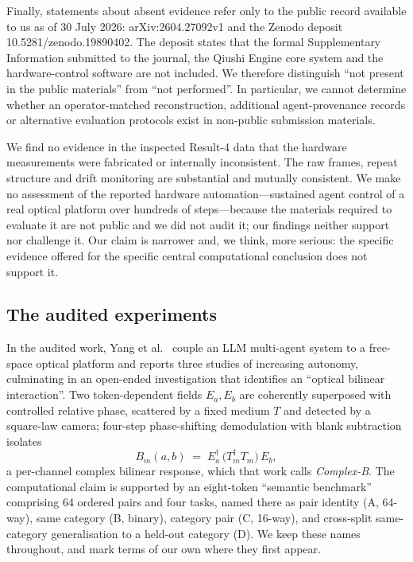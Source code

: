 \documentclass[11pt,a4paper]{article}
\begin{document}
Finally, statements about absent evidence refer only to the public record
available to us as of 30 July 2026: arXiv:2604.27092v1 and the Zenodo deposit
10.5281/zenodo.19890402. The deposit states that the formal Supplementary
Information submitted to the journal, the Qiushi Engine core system and the
hardware-control software are not included. We therefore distinguish ``not
present in the public materials'' from ``not performed''. In particular, we
cannot determine whether an operator-matched reconstruction, additional
agent-provenance records or alternative evaluation protocols exist in
non-public submission materials.


We find no evidence in the inspected Result-4 data that the hardware
measurements were fabricated or internally inconsistent. The raw frames,
repeat structure and drift monitoring are substantial and mutually consistent.
We make no assessment of the reported hardware automation---sustained agent
control of a real optical platform over hundreds of steps---because the
materials required to evaluate it are not public and we did not audit it; our
findings neither support nor challenge it. Our claim is narrower and, we
think, more serious: the specific evidence offered for the specific central
computational conclusion does not support it.

\subsection{The audited experiments}
\label{sec:setup}

In the audited work, Yang et al.~\cite{qiushi} couple an LLM multi-agent system to a
free-space optical platform and reports three studies of increasing autonomy, culminating in an
open-ended investigation that identifies an ``optical bilinear interaction''.
Two token-dependent fields $E_a,E_b$ are coherently superposed with controlled
relative phase, scattered by a fixed medium $T$ and detected by a square-law
camera; four-step phase-shifting demodulation with blank subtraction isolates
\begin{equation}
  B_m(a,b) \;=\; E_a^{\dagger}\,\bigl(T_m^{\dagger}T_m\bigr)\,E_b ,
  \label{eq:B}
\end{equation}
a per-channel complex bilinear response, which that work calls
\emph{Complex-B}. The computational claim is supported by an eight-token
``semantic benchmark'' comprising 64 ordered pairs and four tasks, named there
as pair identity (A, 64-way), same category (B, binary), category pair (C,
16-way), and cross-split same-category generalisation to a held-out category
(D). We keep these names throughout, and mark terms of our own where they
first appear.
\end{document}
